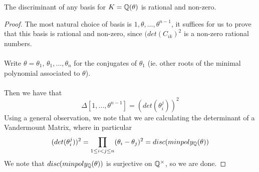 \begin{theorem}[Pg. 42]
The discriminant of any basis for $K = \mathbb{Q}(\theta)$ is rational and non-zero.
\end{theorem}

\begin{proof}
The most natural choice of basis is $1, \theta, ..., \theta^{n-1}$, it suffices for us to prove that this basis is rational and non-zero, since $(det(C_{ik})^2$ is a non-zero rational numbers.\\\\
Write $\theta = \theta_1$, $\theta_1, ..., \theta_n$ for the conjugates of $\theta_1$ (ie. other roots of the minimal polynomial associated to $\theta$).\\\\
Then we have that
\[\Delta[1, ..., \theta^{n-1}] = (det(\theta_{i}^j))^2\]
Using a general observation, we note that we are calculating the determinant of a Vandermount Matrix, where in particular
\[(det(\theta_{i}^j))^2 = \prod_{1 \leq i < j \leq n} (\theta_i - \theta_j)^2 = disc(minpoly_{\mathbb{Q}}(\theta))\]
We note that $disc(minpoly_{\mathbb{Q}}(\theta))$ is surjective on $\mathbb{Q}^\times$, so we are done.
\end{proof}